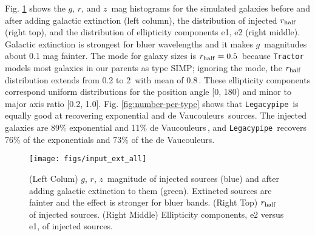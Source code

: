 \documentclass[a4paper,fleqn,usenatbib]{mnras}
\newcommand{\rhalf}{r_{\rm{half}}}
\newcommand{\gb}{$g$}
\newcommand{\rband}{$r$}
\newcommand{\zb}{$z$}
\newcommand{\tractor}{{\tt Tractor}}
\newcommand{\legacypipe}{{\tt Legacypipe}}
\newcommand{\dev}{de Vaucouleurs}
\begin{document}

Fig. \ref{fig:input} shows the \gb, \rband, and \zb\, mag histograms for the simulated galaxies before and after adding galactic extinction (left column), the distribution of injected $\rhalf$ (right top), and the distribution of ellipticity components e1, e2 (right middle). Galactic extinction is strongest for bluer wavelengths and it makes \gb\, magnitudes about 0.1 mag fainter. The mode for galaxy sizes  is $\rhalf  = 0.5$\arcsec\, because \tractor\, models most galaxies in our parents as type SIMP; ignoring the mode, the $\rhalf$ distribution extends from 0.2 to 2\arcsec\, with mean of 0.8\arcsec\,. These ellipticity components correspond uniform distributions for the position angle [0, 180) and minor to major axis ratio [0.2, 1.0]. Fig. \ref{fig:number-per-type} shows that \legacypipe\, is equally good at recovering exponential and \dev\, sources. The injected galaxies are 89\% exponential and 11\% \dev\,, and \legacypipe\, recovers 76\% of the exponentials and 73\% of the \dev.

\begin{figure}
\begin{center}
 \texttt{[image: figs/input\_ext\_all]}
\end{center}
 \caption[Properties of injected galaxies]{(Left Colum) \gb, \rband, \zb\, magnitude of injected sources (blue) and after adding galactic extinction to them (green). Extincted sources are fainter and the effect is stronger for bluer bands. (Right Top) $\rhalf$ of injected sources. (Right Middle) Ellipticity components, e2 versus e1, of injected sources.}
 \label{fig:input}
\end{figure}
\end{document}
